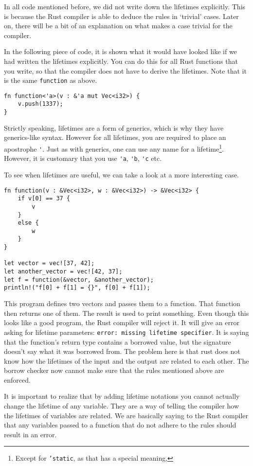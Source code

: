 In all code mentioned before, we did not write down the lifetimes explicitly. This is because the Rust compiler is able to deduce the rules in `trivial' cases. Later on, there will be a bit of an explanation on what makes a case trivial for the compiler.

In the following piece of code, it is shown what it would have looked like if we had written the lifetimes explicitly. You can do this for all Rust functions that you write, so that the compiler does not have to derive the lifetimes. Note that it is the same \verb|function| as above. 

\begin{verbatim}
fn function<'a>(v : &'a mut Vec<i32>) {
    v.push(1337);
}
\end{verbatim}

Strictly speaking, lifetimes are a form of generics, which is why they have generics-like syntax.  However for all lifetimes, you are required to place an apostrophe \verb|'|. Just as with generics, one can use any name for a lifetime\footnote{Except for \texttt{'static}, as that has a special meaning,}. However, it is customary that you use \verb|'a|, \verb|'b|, \verb|'c| etc. 

To see when lifetimes are useful, we can take a look at a more interesting case. 

\begin{verbatim}
fn function(v : &Vec<i32>, w : &Vec<i32>) -> &Vec<i32> {
    if v[0] == 37 {
        v
    }
    else {
        w
    }
}

let vector = vec![37, 42];
let another_vector = vec![42, 37];
let f = function(&vector, &another_vector);
println!("f[0] + f[1] = {}", f[0] + f[1]);
\end{verbatim}

This program defines two vectors and passes them to a function. That function then returns one of them. The result is used to print something. Even though this looks like a good program, the Rust compiler will reject it. It will give an error asking for lifetime parameters: \texttt{error: missing lifetime specifier}. It is saying that the function's return type contains a borrowed value, but the signature doesn't say what it was borrowed from. The problem here is that rust does not know how the lifetimes of the input and the output are related to each other. The borrow checker now cannot make sure that the rules mentioned above are enforced. 

It is important to realize that by adding lifetime notations you cannot actually change the lifetime of any variable. They are a way of telling the compiler how the lifetimes of variables are related. We are basically saying to the Rust compiler that any variables passed to a function that do not adhere to the rules should result in an error. 

